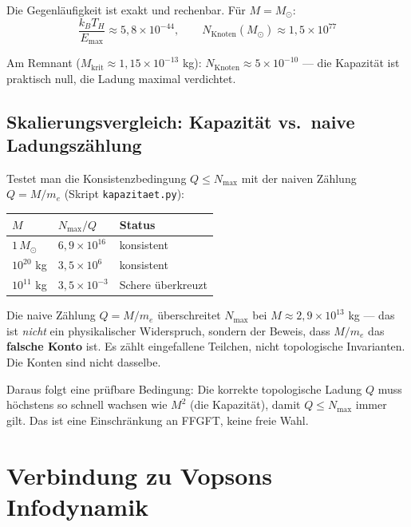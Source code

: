 Die Gegenläufigkeit ist exakt und rechenbar. Für $M = M_\odot$:
\begin{equation}
  \frac{k_B T_H}{E_\text{max}} \approx 5{,}8 \times 10^{-44}, \qquad N_\text{Knoten}(M_\odot) \approx 1{,}5 \times 10^{77}
\end{equation}

Am Remnant ($M_\text{krit} \approx 1{,}15 \times 10^{-13}$ kg): $N_\text{Knoten} \approx 5 \times 10^{-10}$ --- die Kapazität ist praktisch null, die Ladung maximal verdichtet.

\subsection{Skalierungsvergleich: Kapazität vs.\ naive Ladungszählung}

Testet man die Konsistenzbedingung $Q \leq N_\text{max}$ mit der naiven Zählung $Q = M/m_e$ (Skript \texttt{kapazitaet.py}):

\begin{center}
\begin{tabular}{lll}
\toprule
$M$ & $N_\text{max}/Q$ & Status \\
\midrule
$1\,M_\odot$ & $6{,}9 \times 10^{16}$ & konsistent \\
$10^{20}$ kg & $3{,}5 \times 10^{6}$ & konsistent \\
$10^{11}$ kg & $3{,}5 \times 10^{-3}$ & Schere überkreuzt \\
\bottomrule
\end{tabular}
\end{center}

\begin{wichtig}
Die naive Zählung $Q = M/m_e$ überschreitet $N_\text{max}$ bei $M \approx 2{,}9 \times 10^{13}$ kg --- das ist \emph{nicht} ein physikalischer Widerspruch, sondern der Beweis, dass $M/m_e$ das \textbf{falsche Konto} ist. Es zählt eingefallene Teilchen, nicht topologische Invarianten. Die Konten sind nicht dasselbe.
\end{wichtig}

Daraus folgt eine prüfbare Bedingung: Die korrekte topologische Ladung $Q$ muss höchstens so schnell wachsen wie $M^2$ (die Kapazität), damit $Q \leq N_\text{max}$ immer gilt. Das ist eine Einschränkung an FFGFT, keine freie Wahl.

\section{Verbindung zu Vopsons Infodynamik}

